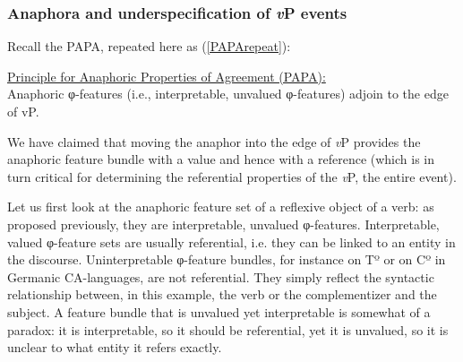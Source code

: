 \subsubsection{Anaphora and underspecification of \textit{v}P events}

Recall the PAPA, repeated here as (\ref{PAPArepeat}): 

\ea \label{PAPArepeat} \underline{Principle for Anaphoric Properties of Agreement  (PAPA):} \\
Anaphoric φ-features (i.e., interpretable, unvalued φ-features) adjoin to the edge of vP.
\z

We have claimed that moving the anaphor into the edge of \textit{v}P provides the anaphoric feature bundle with a value and hence with a reference (which is in turn critical for determining the referential properties of the \textit{v}P, the entire event).


Let us first look at the anaphoric feature set of a reflexive object of a verb: as proposed previously, they are interpretable, unvalued φ-features. Interpretable, valued φ-feature sets are usually referential, i.e. they can be linked to an entity in the discourse. Uninterpretable φ-feature bundles, for instance on Tº or on Cº in Germanic CA-languages, are not referential. They simply reflect the syntactic relationship between, in this example, the verb or the complementizer and the subject. A feature bundle that is unvalued yet interpretable is somewhat of a paradox: it is interpretable, so it should be referential, yet it is unvalued, so it is unclear to what entity it refers exactly. 

